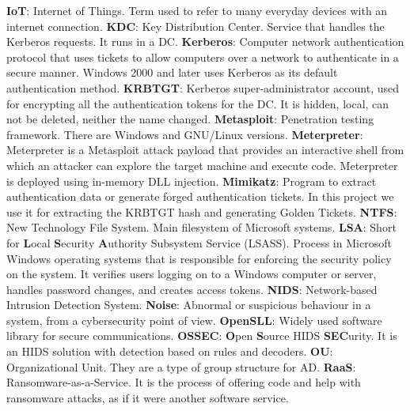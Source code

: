 \linej
\linej
\textbf{IoT}: Internet of Things. Term used to refer to many everyday devices with an internet connection.
\linej
\linej
\textbf{KDC}: Key Distribution Center. Service that handles the Kerberos requests. It runs in a DC.
\linej
\linej
\textbf{Kerberos}: Computer network authentication protocol that uses tickets to allow computers over a network to authenticate in a secure manner. Windows 2000 and later uses Kerberos as its default authentication method.
\linej
\linej
\textbf{KRBTGT}: Kerberos super-administrator account, used for encrypting all the authentication tokens for the DC. It is hidden, local, can not be deleted, neither the name changed.
\linej
\linej
\textbf{Metasploit}: Penetration testing framework. There are Windows and GNU/Linux versions.
\linej
\linej
\textbf{Meterpreter}: Meterpreter is a Metasploit attack payload that provides an interactive shell from which an attacker can explore the target machine and execute code. Meterpreter is deployed using in-memory DLL injection.
\linej
\linej
\textbf{Mimikatz}: Program to extract authentication data or generate forged authentication tickets. In this project we use it for extracting the KRBTGT hash and generating Golden Tickets.
\linej
\linej
\textbf{NTFS}: New Technology File System. Main filesystem of Microsoft systems.
\linej
\linej
\textbf{LSA}: Short for \textbf{L}ocal \textbf{S}ecurity \textbf{A}uthority Subsystem Service (LSASS). Process in Microsoft Windows operating systems that is responsible for enforcing the security policy on the system. It verifies users logging on to a Windows computer or server, handles password changes, and creates access tokens.
\linej
\linej
\textbf{NIDS}: Network-based Intrusion Detection System.
\linej
\linej
\textbf{Noise}: Abnormal or suspicious behaviour in a system, from a cybersecurity point of view.
\linej
\linej
\textbf{OpenSLL}: Widely used software library for secure communications.
\linej
\linej
\textbf{OSSEC}: \textbf{O}pen \textbf{S}ource HIDS \textbf{SEC}urity. It is an HIDS solution with detection based on rules and decoders.
\linej
\linej
\textbf{OU}: Organizational Unit. They are a type of group structure for AD.
\linej
\linej
\textbf{RaaS}: Ransomware-as-a-Service. It is the process of offering code and help with ransomware attacks, as if it were another software service.
